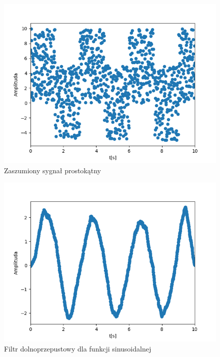 \documentclass[12pt]{article}
\begin{document}
\begin{figure}[H]
\centering
\includegraphics[scale=0.6]{prostokatSzum.png}
\caption{Zaszumiony sygnał prostokątny}
\end{figure}

\begin{figure}[H]
\centering
\includegraphics[scale=0.6]{filtrDolSinus.png}
\caption{Filtr dolnoprzepustowy dla funkcji sinusoidalnej}
\end{figure}
\end{document}
